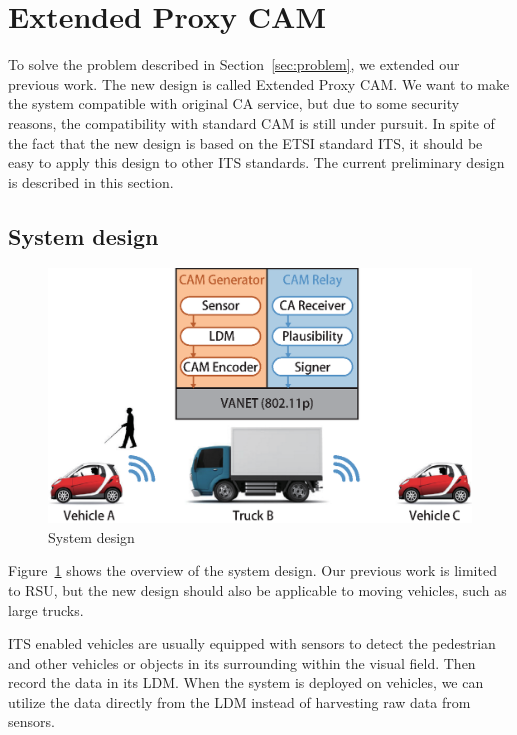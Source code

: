 \section{Extended Proxy CAM} \label{sec:iproxy_cam}

To solve the problem described in Section~\ref{sec:problem},
we extended our previous work.
The new design is called Extended Proxy CAM.
We want to make the system compatible with original CA service,
but due to some security reasons, the compatibility with standard CAM is still under pursuit.
In spite of the fact that the new design is based on the ETSI standard ITS,
it should be easy to apply this design to other ITS standards.
The current preliminary design is described in this section.

\subsection{System design}

\begin{figure}[htbp]
    \begin{center}
        \includegraphics[width=0.85\linewidth]{figures/exProxyCAM.eps}
        \caption{System design}
        \label{fig:system_design}
    \end{center}
\end{figure}

Figure~\ref{fig:system_design} shows the overview of the system design.
Our previous work is limited to RSU, but the new design should also be applicable to moving vehicles, such as large trucks.

ITS enabled vehicles are usually equipped with sensors to detect the pedestrian
and other vehicles or objects in its surrounding within the visual field.
Then record the data in its LDM.
When the system is deployed on vehicles, we can utilize the data directly from the LDM instead of harvesting raw data from sensors.

